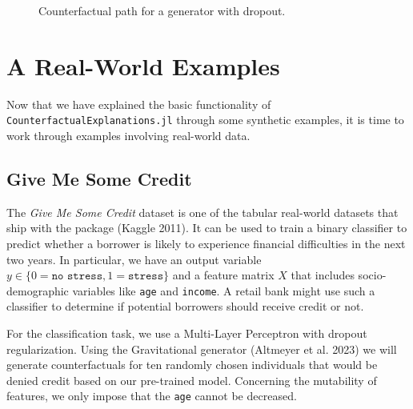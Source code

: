 \documentclass{juliacon}
\begin{document}
\begin{figure}


\caption{\label{fig-dropout}Counterfactual path for a generator with
dropout.}

\end{figure}%

\section{A Real-World Examples}\label{sec-emp}

Now that we have explained the basic functionality of
\texttt{CounterfactualExplanations.jl} through some synthetic examples,
it is time to work through examples involving real-world data.

\subsection{Give Me Some Credit}\label{give-me-some-credit}

The \emph{Give Me Some Credit} dataset is one of the tabular real-world
datasets that ship with the package (Kaggle 2011). It can be used to
train a binary classifier to predict whether a borrower is likely to
experience financial difficulties in the next two years. In particular,
we have an output variable
\(y \in \{0=\texttt{no stress},1=\texttt{stress}\}\) and a feature
matrix \(X\) that includes socio-demographic variables like \texttt{age}
and \texttt{income}. A retail bank might use such a classifier to
determine if potential borrowers should receive credit or not.

For the classification task, we use a Multi-Layer Perceptron with
dropout regularization. Using the Gravitational generator (Altmeyer et
al. 2023) we will generate counterfactuals for ten randomly chosen
individuals that would be denied credit based on our pre-trained model.
Concerning the mutability of features, we only impose that the
\texttt{age} cannot be decreased.
\end{document}
